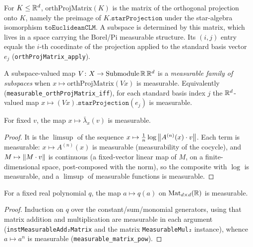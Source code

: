 \begin{definition}\label{orthProjMatrix}
  \leanok
  For $K\le\mathbb{R}^d$, $\mathrm{orthProjMatrix}(K)$ is the matrix of the orthogonal
  projection onto $K$, namely the preimage of $K.\mathtt{starProjection}$ under
  the star-algebra isomorphism $\mathtt{toEuclideanCLM}$. A subspace is
  determined by this matrix, which lives in a space carrying the Borel/Pi
  measurable structure. Its $(i,j)$ entry equals the $i$-th coordinate of the
  projection applied to the standard basis vector $e_j$
  (\texttt{orthProjMatrix\_apply}).
\end{definition}

\begin{definition}\label{MeasurableSubspace}
  \leanok
  A subspace-valued map $V\colon X\to\mathrm{Submodule}\,\mathbb{R}\,\mathbb{R}^d$ is a
  \emph{measurable family of subspaces} when $x\mapsto\mathrm{orthProjMatrix}(V x)$
  is measurable. Equivalently (\texttt{measurable\_orthProjMatrix\_iff}), for each
  standard basis index $j$ the $\mathbb{R}^d$-valued map
  $x\mapsto (V x).\mathtt{starProjection}(e_j)$ is measurable.
\end{definition}

\begin{lemma}\label{measurable_lambdaBar_apply}
  \leanok
  For fixed $v$, the map $x\mapsto\bar\lambda_x(v)$ is measurable.
  \begin{proof}\leanok
  It is the $\limsup$ of the sequence
  $x\mapsto\tfrac1n\log\left\lVert A^{(n)}(x)\cdot v \right\rVert$. Each term is measurable:
  $x\mapsto A^{(n)}(x)$ is measurable (measurability of the cocycle), and
  $M\mapsto\left\lVert M\cdot v \right\rVert$ is continuous (a fixed-vector linear map of $M$,
  on a finite-dimensional space, post-composed with the norm), so the composite
  with $\log$ is measurable, and a $\limsup$ of measurable functions is measurable.
  \end{proof}
\end{lemma}

\begin{lemma}\label{measurable_aeval_matrix}
  \leanok
  For a fixed real polynomial $q$, the map $a\mapsto q(a)$ on
  $\mathrm{Mat}_{d\times d}(\mathbb{R})$ is measurable.
  \begin{proof}\leanok
  Induction on $q$ over the constant/sum/monomial generators, using that matrix
  addition and multiplication are measurable in each argument
  (\texttt{instMeasurableAdd₂Matrix} and the matrix \texttt{MeasurableMul₂}
  instance), whence $a\mapsto a^n$ is measurable (\texttt{measurable\_matrix\_pow}).
  \end{proof}
\end{lemma}

